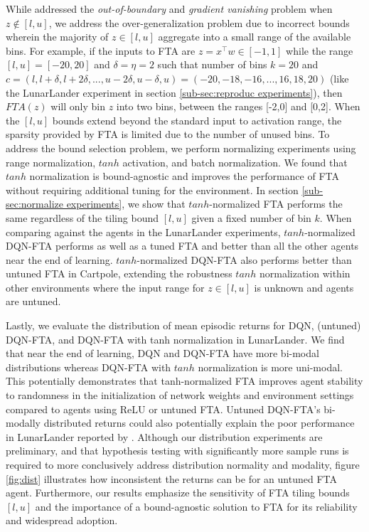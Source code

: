 \documentclass{article}
\begin{document}
While \cite{pan2019fuzzy} addressed the \textit{out-of-boundary} and \textit{gradient vanishing} problem when $z \notin [l,u]$, we address the over-generalization problem due to incorrect bounds wherein the majority of $z \in [l,u]$ aggregate into a small range of the available bins. 
For example, if the inputs to FTA are $z = x^\top w \in [-1,1]$ while the range $[l,u] = [-20,20]$ and $\delta = \eta = 2$ such that number of bins $k=20$ and $c=(l, l+\delta, l+2\delta, ..., u-2\delta, u-\delta, u) = (-20, -18, -16, ..., 16, 18, 20)$ (like the LunarLander experiment in section \ref{sub-sec:reproduc experiments}), then $FTA(z)$ will only bin $z$ into two bins, between the ranges [-2,0] and [0,2]. 
When the $[l,u]$ bounds extend beyond the standard input to activation range, the sparsity provided by FTA is limited due to the number of unused bins. 
To address the bound selection problem, we perform normalizing experiments using range normalization, $tanh$ activation, and batch normalization. 
We found that $tanh$ normalization is bound-agnostic and improves the performance of FTA without requiring additional tuning for the environment. 
In section \ref{sub-sec:normalize experiments}, we show that $tanh$-normalized FTA performs the same regardless of the tiling bound $[l,u]$ given a fixed number of bin $k$. 
When comparing against the agents in the LunarLander experiments, $tanh$-normalized DQN-FTA performs as well as a tuned FTA and better than all the other agents near the end of learning. 
$tanh$-normalized DQN-FTA also performs better than untuned FTA in Cartpole, extending the robustness $tanh$ normalization within other environments where the input range for $z \in [l,u]$ is unknown and agents are untuned. 

Lastly, we evaluate the distribution of mean episodic returns for DQN, (untuned) DQN-FTA, and DQN-FTA with tanh normalization in LunarLander. 
We find that near the end of learning, DQN and DQN-FTA have more bi-modal distributions whereas DQN-FTA with $tanh$ normalization is more uni-modal. 
This potentially demonstrates that tanh-normalized FTA improves agent stability to randomness in the initialization of network weights and environment settings compared to agents using ReLU or untuned FTA. 
Untuned DQN-FTA’s bi-modally distributed returns could also potentially explain the poor performance in LunarLander reported by \cite{pan2019fuzzy}. 
Although our distribution experiments are preliminary, and that hypothesis testing with significantly more sample runs is required to more conclusively address distribution normality and modality, figure \ref{fig:dist} illustrates how inconsistent the returns can be for an untuned FTA agent. 
Furthermore, our results emphasize the sensitivity of FTA tiling bounds $[l,u]$ and the importance of a bound-agnostic solution to FTA for its reliability and widespread adoption.
\end{document}
